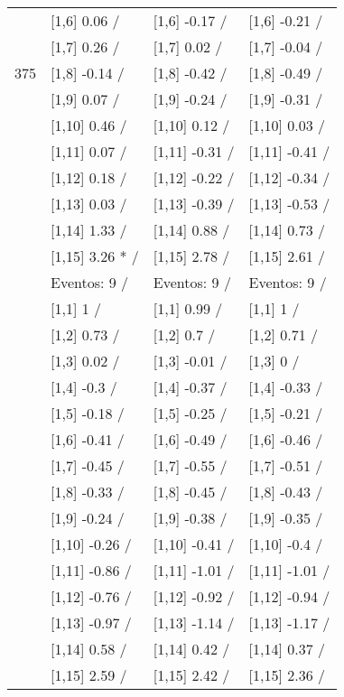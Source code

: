 \begin{table}
\begin{tabular}[t]{llll}
 & {}[1,6] 0.06  / & {}[1,6] -0.17  / & {}[1,6] -0.21  /\\
 & {}[1,7] 0.26  / & {}[1,7] 0.02  / & {}[1,7] -0.04  /\\
375 & {}[1,8] -0.14  / & {}[1,8] -0.42  / & {}[1,8] -0.49  /\\
\addlinespace
 & {}[1,9] 0.07  / & {}[1,9] -0.24  / & {}[1,9] -0.31  /\\
 & {}[1,10] 0.46  / & {}[1,10] 0.12  / & {}[1,10] 0.03  /\\
 & {}[1,11] 0.07  / & {}[1,11] -0.31  / & {}[1,11] -0.41  /\\
 & {}[1,12] 0.18  / & {}[1,12] -0.22  / & {}[1,12] -0.34  /\\
 & {}[1,13] 0.03  / & {}[1,13] -0.39  / & {}[1,13] -0.53  /\\
\addlinespace
 & {}[1,14] 1.33  / & {}[1,14] 0.88  / & {}[1,14] 0.73  /\\
 & {}[1,15] 3.26 * / & {}[1,15] 2.78  / & {}[1,15] 2.61  /\\
 & Eventos:  9 / & Eventos:  9 / & Eventos:  9 /\\
 & {}[1,1] 1  / & {}[1,1] 0.99  / & {}[1,1] 1  /\\
 & {}[1,2] 0.73  / & {}[1,2] 0.7  / & {}[1,2] 0.71  /\\
\addlinespace
 & {}[1,3] 0.02  / & {}[1,3] -0.01  / & {}[1,3] 0  /\\
 & {}[1,4] -0.3  / & {}[1,4] -0.37  / & {}[1,4] -0.33  /\\
 & {}[1,5] -0.18  / & {}[1,5] -0.25  / & {}[1,5] -0.21  /\\
 & {}[1,6] -0.41  / & {}[1,6] -0.49  / & {}[1,6] -0.46  /\\
 & {}[1,7] -0.45  / & {}[1,7] -0.55  / & {}[1,7] -0.51  /\\
\addlinespace
500 & {}[1,8] -0.33  / & {}[1,8] -0.45  / & {}[1,8] -0.43  /\\
 & {}[1,9] -0.24  / & {}[1,9] -0.38  / & {}[1,9] -0.35  /\\
 & {}[1,10] -0.26  / & {}[1,10] -0.41  / & {}[1,10] -0.4  /\\
 & {}[1,11] -0.86  / & {}[1,11] -1.01  / & {}[1,11] -1.01  /\\
 & {}[1,12] -0.76  / & {}[1,12] -0.92  / & {}[1,12] -0.94  /\\
\addlinespace
 & {}[1,13] -0.97  / & {}[1,13] -1.14  / & {}[1,13] -1.17  /\\
 & {}[1,14] 0.58  / & {}[1,14] 0.42  / & {}[1,14] 0.37  /\\
 & {}[1,15] 2.59  / & {}[1,15] 2.42  / & {}[1,15] 2.36  /\\
\bottomrule
\end{tabular}
\end{table}
